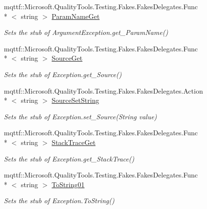 \begin{DoxyCompactItemize}
mqttf\-::\-Microsoft.\-Quality\-Tools.\-Testing.\-Fakes.\-Fakes\-Delegates.\-Func\\*
$<$ string $>$ \hyperlink{class_system_1_1_globalization_1_1_fakes_1_1_stub_culture_not_found_exception_ad77d9ee540c3f9f373bbb1f087fefcd7}{Param\-Name\-Get}
\begin{DoxyCompactList}\small\item\em Sets the stub of Argument\-Exception.\-get\-\_\-\-Param\-Name()\end{DoxyCompactList}\item 
mqttf\-::\-Microsoft.\-Quality\-Tools.\-Testing.\-Fakes.\-Fakes\-Delegates.\-Func\\*
$<$ string $>$ \hyperlink{class_system_1_1_globalization_1_1_fakes_1_1_stub_culture_not_found_exception_a021f2b9d3b203acf031234594c552f99}{Source\-Get}
\begin{DoxyCompactList}\small\item\em Sets the stub of Exception.\-get\-\_\-\-Source()\end{DoxyCompactList}\item 
mqttf\-::\-Microsoft.\-Quality\-Tools.\-Testing.\-Fakes.\-Fakes\-Delegates.\-Action\\*
$<$ string $>$ \hyperlink{class_system_1_1_globalization_1_1_fakes_1_1_stub_culture_not_found_exception_a86dc4df2c3a399b6fca803da7aa59799}{Source\-Set\-String}
\begin{DoxyCompactList}\small\item\em Sets the stub of Exception.\-set\-\_\-\-Source(\-String value)\end{DoxyCompactList}\item 
mqttf\-::\-Microsoft.\-Quality\-Tools.\-Testing.\-Fakes.\-Fakes\-Delegates.\-Func\\*
$<$ string $>$ \hyperlink{class_system_1_1_globalization_1_1_fakes_1_1_stub_culture_not_found_exception_a327ee305db51b38fc9d0924e8a16289f}{Stack\-Trace\-Get}
\begin{DoxyCompactList}\small\item\em Sets the stub of Exception.\-get\-\_\-\-Stack\-Trace()\end{DoxyCompactList}\item 
mqttf\-::\-Microsoft.\-Quality\-Tools.\-Testing.\-Fakes.\-Fakes\-Delegates.\-Func\\*
$<$ string $>$ \hyperlink{class_system_1_1_globalization_1_1_fakes_1_1_stub_culture_not_found_exception_a6ecc1f8b718353bfa4506812f8a47976}{To\-String01}
\begin{DoxyCompactList}\small\item\em Sets the stub of Exception.\-To\-String()\end{DoxyCompactList}\end{DoxyCompactItemize}
